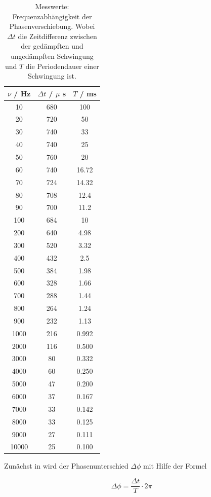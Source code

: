 \begin{table}
  \centering
  \caption{Messwerte: Frequenzabhängigkeit der Phasenverschiebung. Wobei $\Delta t$ die Zeitdifferenz
  zwischen der gedämpften und ungedämpften Schwingung und $T$ die Periodendauer einer Schwingung ist.}
  \label{table3}
  \begin{tabular}{c c c}
    \toprule
    $\nu$ / Hz & $\Delta t$ / $\mu$ s & $T$ / ms \\
    \midrule
    10 & 680 & 100\\
    20 & 720 & 50\\
    30 & 740 & 33\\
    40 & 740 & 25\\
    50 & 760 & 20\\
    60 & 740 & 16.72\\
    70 & 724 & 14.32\\
    80 & 708 & 12.4\\
    90 & 700 & 11.2\\
    100 & 684 & 10\\
    200 & 640 & 4.98\\
    300 & 520 & 3.32\\
    400 & 432 & 2.5\\
    500 & 384 & 1.98\\
    600 & 328 & 1.66\\
    700 & 288 & 1.44\\
    800 & 264 & 1.24\\
    900 & 232 & 1.13\\
    1000 & 216 & 0.992\\
    2000 & 116 & 0.500\\
    3000 & 80 & 0.332\\
    4000 & 60 & 0.250\\
    5000 & 47 & 0.200\\
    6000 & 37 & 0.167\\
    7000 & 33 & 0.142\\
    8000 & 33 & 0.125\\
    9000 & 27 & 0.111\\
    10000 & 25 & 0.100\\
    \bottomrule
  \end{tabular}
\end{table}

Zunächst in wird der Phasenunterschied $\Delta\phi$ mit Hilfe der Formel

\begin{equation*}
  \Delta\phi = \frac{\Delta t}{T} \cdot 2 \pi
\end{equation*}

